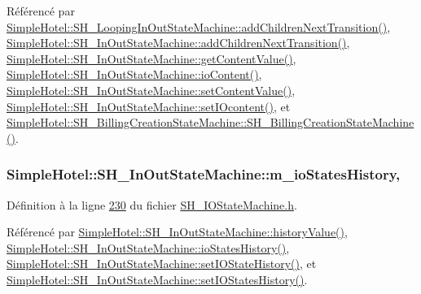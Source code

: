 Référencé par \hyperlink{classSimpleHotel_1_1SH__LoopingInOutStateMachine_a2ac2ff43d97fd1b12e1b30d6818f33e4}{Simple\-Hotel\-::\-S\-H\-\_\-\-Looping\-In\-Out\-State\-Machine\-::add\-Children\-Next\-Transition()}, \hyperlink{classSimpleHotel_1_1SH__InOutStateMachine_aaf5afe04d6e4d3d5ebf0b5f1b00eddf1}{Simple\-Hotel\-::\-S\-H\-\_\-\-In\-Out\-State\-Machine\-::add\-Children\-Next\-Transition()}, \hyperlink{classSimpleHotel_1_1SH__InOutStateMachine_a4e2afab69163c7ce53dd6a40c793d5dc}{Simple\-Hotel\-::\-S\-H\-\_\-\-In\-Out\-State\-Machine\-::get\-Content\-Value()}, \hyperlink{classSimpleHotel_1_1SH__InOutStateMachine_a378618937520bc65b6e25cd187a92aad}{Simple\-Hotel\-::\-S\-H\-\_\-\-In\-Out\-State\-Machine\-::io\-Content()}, \hyperlink{classSimpleHotel_1_1SH__InOutStateMachine_aaf92da452f6cf7cc57aa9e60f88322e4}{Simple\-Hotel\-::\-S\-H\-\_\-\-In\-Out\-State\-Machine\-::set\-Content\-Value()}, \hyperlink{classSimpleHotel_1_1SH__InOutStateMachine_a60245aa45ba2b9720965412774e123fb}{Simple\-Hotel\-::\-S\-H\-\_\-\-In\-Out\-State\-Machine\-::set\-I\-Ocontent()}, et \hyperlink{classSimpleHotel_1_1SH__BillingCreationStateMachine_a8c7d39e11d0ced1fd9c27a5550465b86}{Simple\-Hotel\-::\-S\-H\-\_\-\-Billing\-Creation\-State\-Machine\-::\-S\-H\-\_\-\-Billing\-Creation\-State\-Machine()}.

\hypertarget{classSimpleHotel_1_1SH__InOutStateMachine_a45a7defb15e50a196bc471017fc86eb4}{
\subsubsection[{m\-\_\-io\-States\-History}]{\setlength{\rightskip}{0pt plus 5cm}Simple\-Hotel\-::\-S\-H\-\_\-\-In\-Out\-State\-Machine\-::m\-\_\-io\-States\-History\hspace{0.3cm}{\ttfamily [protected]}, {\ttfamily [inherited]}}}\label{classSimpleHotel_1_1SH__InOutStateMachine_a45a7defb15e50a196bc471017fc86eb4}


Définition à la ligne \hyperlink{SH__IOStateMachine_8h_source_l00230}{230} du fichier \hyperlink{SH__IOStateMachine_8h_source}{S\-H\-\_\-\-I\-O\-State\-Machine.\-h}.



Référencé par \hyperlink{classSimpleHotel_1_1SH__InOutStateMachine_af9de98943b9428ed4144bc6695c1ada0}{Simple\-Hotel\-::\-S\-H\-\_\-\-In\-Out\-State\-Machine\-::history\-Value()}, \hyperlink{classSimpleHotel_1_1SH__InOutStateMachine_a0f59a90204a7cbb6835da28cd234978f}{Simple\-Hotel\-::\-S\-H\-\_\-\-In\-Out\-State\-Machine\-::io\-States\-History()}, \hyperlink{classSimpleHotel_1_1SH__InOutStateMachine_a7a6675495f101d29e8eb86df84961795}{Simple\-Hotel\-::\-S\-H\-\_\-\-In\-Out\-State\-Machine\-::set\-I\-O\-State\-History()}, et \hyperlink{classSimpleHotel_1_1SH__InOutStateMachine_a31eb01c590e5d9f6422eacc54d2092da}{Simple\-Hotel\-::\-S\-H\-\_\-\-In\-Out\-State\-Machine\-::set\-I\-O\-States\-History()}.

